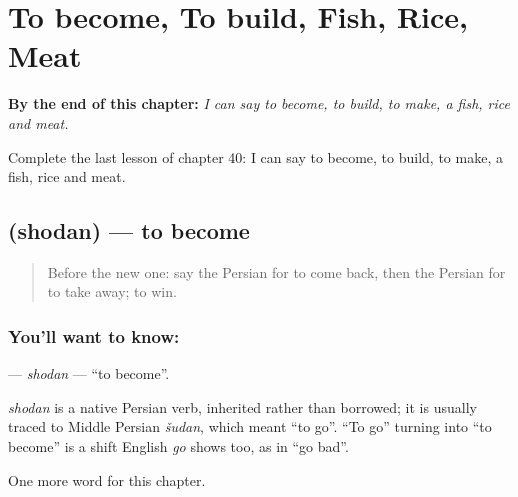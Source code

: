 
\chapter{To become, To build, Fish, Rice, Meat}
\label{ch:fa-to-become-to-build-fish-rice-meat}

\begin{chapteropening}
\textbf{By the end of this chapter:} \emph{I can say to become, to build, to make, a fish, rice and meat.}

Complete the last lesson of chapter 40: I can say to become, to build, to make, a fish, rice and meat.
\end{chapteropening}

\section[\texorpdfstring{\fa{شدن} (shodan)}{شدن (shodan)}]{ (shodan) — to become}

\label{lesson:FA-C40-shodan}



\begin{quote}
Before the new one: say the Persian for to come back, then the Persian for to take away; to win.
\end{quote}

\subsection*{You'll want to know: }
\textbf{} — \emph{shodan} — \textquotedblleft{}to become\textquotedblright{}.

\begin{cousinweb}
\emph{shodan} is a native Persian verb, inherited rather than borrowed; it is usually traced to Middle Persian \emph{šudan}, which meant \textquotedblleft{}to go\textquotedblright{}. \textquotedblleft{}To go\textquotedblright{} turning into \textquotedblleft{}to become\textquotedblright{} is a shift English \emph{go} shows too, as in \textquotedblleft{}go bad\textquotedblright{}.
\end{cousinweb}

\begin{grammarlens}[title={What you've built}]
One more word for this chapter.
\end{grammarlens}

